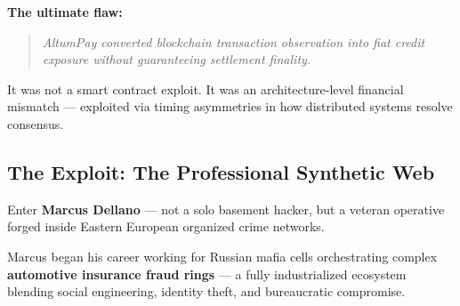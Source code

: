 \bigskip

\textbf{The ultimate flaw:}

\begin{quote}
\emph{AltumPay converted blockchain transaction observation into fiat credit exposure without guaranteeing settlement finality.}
\end{quote}

It was not a smart contract exploit.  
It was an architecture-level financial mismatch — exploited via timing asymmetries in how distributed systems resolve consensus.



\subsection{The Exploit: The Professional Synthetic Web}

Enter \textbf{Marcus Dellano} — not a solo basement hacker, but a veteran operative forged inside Eastern European organized crime networks. 

Marcus began his career working for Russian mafia cells orchestrating complex \textbf{automotive insurance fraud rings} — a fully industrialized ecosystem blending social engineering, identity theft, and bureaucratic compromise.

\medskip

